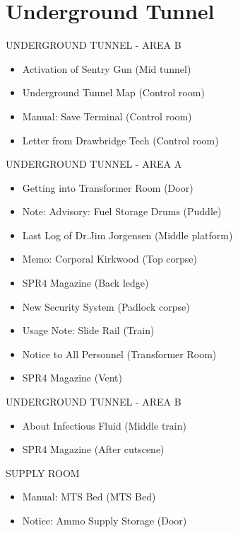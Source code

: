\chapter{Underground Tunnel}

\begin{subregion}{UNDERGROUND TUNNEL - AREA B}
    \begin{itemize}
        \item Activation of Sentry Gun (Mid tunnel)
        \item Underground Tunnel Map (Control room)
        \item Manual: Save Terminal (Control room)
        \item Letter from Drawbridge Tech (Control room)
    \end{itemize}
\end{subregion}

\begin{subregion}{UNDERGROUND TUNNEL - AREA A}
    \begin{itemize}
        \item Getting into Transformer Room (Door)
        \item Note: Advisory: Fuel Storage Drums (Puddle)
        \item Last Log of Dr.Jim Jorgensen (Middle platform)
        \item Memo: Corporal Kirkwood (Top corpse)
        \item SPR4 Magazine (Back ledge)
        \item New Security System (Padlock corpse)
        \item Usage Note: Slide Rail (Train)
        \item Notice to All Personnel (Transformer Room)
        \item SPR4 Magazine (Vent)
    \end{itemize}
\end{subregion}

\begin{subregion}{UNDERGROUND TUNNEL - AREA B}
    \begin{itemize}
        \item About Infectious Fluid (Middle train)
        \item SPR4 Magazine (After cutscene)
    \end{itemize}
\end{subregion}

\begin{subregion}{SUPPLY ROOM}
    \begin{itemize}
        \item Manual: MTS Bed (MTS Bed)        
        \item Notice: Ammo Supply Storage (Door)
    \end{itemize}
\end{subregion}

